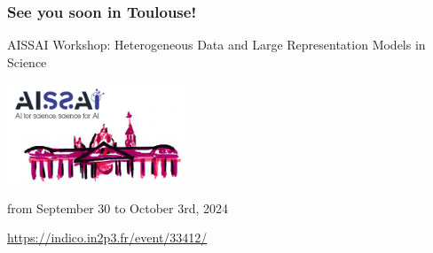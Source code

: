 \begin{frame}
  \frametitle{See you soon in Toulouse!}
  \begin{center}\LARGE AISSAI Workshop: Heterogeneous Data and Large Representation Models in Science\end{center}
  \begin{center}\includegraphics[width=200px]{img/invitation.png}\end{center}
  
  \begin{center}\large from September 30 to October 3rd, 2024\end{center}
  \begin{center}\large \url{https://indico.in2p3.fr/event/33412/}\end{center}
\end{frame}
